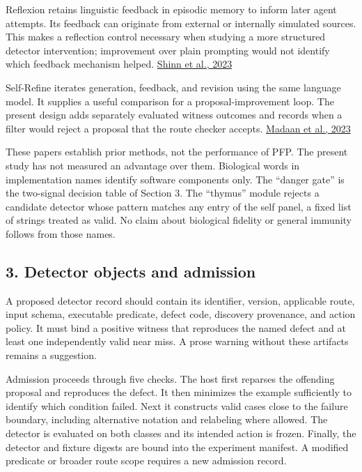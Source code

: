 \documentclass[
  11pt,
]{article}
\begin{document}
Reflexion retains linguistic feedback in episodic memory to inform later
agent attempts. Its feedback can originate from external or internally
simulated sources. This makes a reflection control necessary when
studying a more structured detector intervention; improvement over plain
prompting would not identify which feedback mechanism helped.
\href{https://arxiv.org/abs/2303.11366v4}{Shinn et al., 2023}

Self-Refine iterates generation, feedback, and revision using the same
language model. It supplies a useful comparison for a
proposal-improvement loop. The present design adds separately evaluated
witness outcomes and records when a filter would reject a proposal that
the route checker accepts.
\href{https://arxiv.org/abs/2303.17651v2}{Madaan et al., 2023}

These papers establish prior methods, not the performance of PFP. The
present study has not measured an advantage over them. Biological words
in implementation names identify software components only. The ``danger
gate'' is the two-signal decision table of Section 3. The ``thymus''
module rejects a candidate detector whose pattern matches any entry of
the self panel, a fixed list of strings treated as valid. No claim about
biological fidelity or general immunity follows from those names.

\hypertarget{detector-objects-and-admission}{%
\subsection{3. Detector objects and
admission}\label{detector-objects-and-admission}}

A proposed detector record should contain its identifier, version,
applicable route, input schema, executable predicate, defect code,
discovery provenance, and action policy. It must bind a positive witness
that reproduces the named defect and at least one independently valid
near miss. A prose warning without these artifacts remains a suggestion.

Admission proceeds through five checks. The host first reparses the
offending proposal and reproduces the defect. It then minimizes the
example sufficiently to identify which condition failed. Next it
constructs valid cases close to the failure boundary, including
alternative notation and relabeling where allowed. The detector is
evaluated on both classes and its intended action is frozen. Finally,
the detector and fixture digests are bound into the experiment manifest.
A modified predicate or broader route scope requires a new admission
record.
\end{document}
